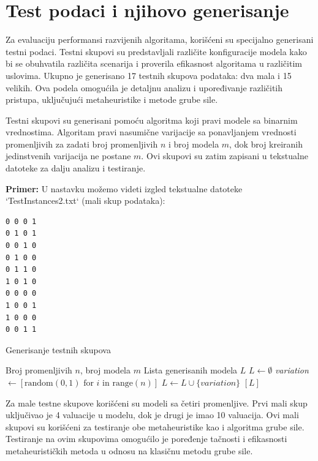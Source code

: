 \documentclass[12pt,oneside]{memoir}
\begin{document}
\section{Test podaci i njihovo generisanje}

Za evaluaciju performansi razvijenih algoritama, korišćeni su specijalno generisani testni podaci. Testni skupovi su predstavljali različite konfiguracije modela kako bi se obuhvatila različita scenarija i proverila efikasnost algoritama u različitim uslovima. Ukupno je generisano 17 testnih skupova podataka: dva mala i 15 velikih. Ova podela omogućila je detaljnu analizu i upoređivanje različitih pristupa, uključujući metaheuristike i metode grube sile.

Testni skupovi su generisani pomoću algoritma koji pravi modele sa binarnim vrednostima. Algoritam pravi nasumične varijacije sa ponavljanjem vrednosti promenljivih za zadati broj promenljivih $n$ i broj modela $m$, dok broj kreiranih jedinstvenih varijacija ne postane $m$. Ovi skupovi su zatim zapisani u tekstualne datoteke za dalju analizu i testiranje.

\newpage

\textbf{Primer:} U nastavku možemo videti izgled tekstualne datoteke `TestInstances2.txt` (mali skup podataka):

\begin{lstlisting}[basicstyle=\ttfamily, frame=single]
0 0 0 1
0 1 0 1
0 0 1 0
0 1 0 0
0 1 1 0
1 0 1 0
0 0 0 0
1 0 0 1
1 0 0 0
0 0 1 1
\end{lstlisting}

\begin{algorithm}[H]
\caption{Generisanje testnih skupova}
\renewcommand{\algorithmicrequire}{\textbf{Ulaz:}}
\renewcommand{\algorithmicensure}{\textbf{Izlaz:}}
\begin{algorithmic}[1]
\REQUIRE Broj promenljivih $n$, broj modela $m$
\ENSURE Lista generisanih modela $L$ 
\STATE $L \gets \emptyset$
    \STATE \textit{variation} $\gets [\text{random}(0, 1) \text{ for } i \text{ in } \text{range}(n)]$
    \STATE $L \gets L \cup \{variation\}$
\ENDWHILE
\RETURN $[L]$
\end{algorithmic}
\end{algorithm}

Za male testne skupove korišćeni su modeli sa četiri promenljive. Prvi mali skup uključivao je 4 valuacije u modelu, dok je drugi je imao 10 valuacija. Ovi mali skupovi su korišćeni za testiranje obe metaheuristike kao i algoritma grube sile. Testiranje na ovim skupovima omogućilo je poređenje tačnosti i efikasnosti metaheurističkih metoda u odnosu na klasičnu metodu grube sile. 
\end{document}

